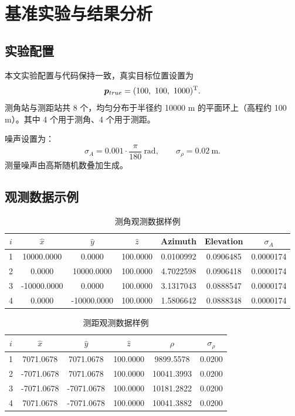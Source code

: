 \chapter{基准实验与结果分析}

\section{实验配置}
本文实验配置与代码保持一致，真实目标位置设置为
\[
\bm p_{true}=(100,\ 100,\ 1000)^{\mathrm{T}}.
\]
测角站与测距站共 8 个，均匀分布于半径约 10000 m 的平面环上（高程约 100 m）。其中 4 个用于测角、4 个用于测距。

噪声设置为：
\[
\sigma_A=0.001\cdot \frac{\pi}{180}\ \text{rad},\qquad
\sigma_\rho=0.02\ \text{m}.
\]
测量噪声由高斯随机数叠加生成。

\section{观测数据示例}
\begin{table}[H]
\centering
\caption{测角观测数据样例}
\begin{tabular}{ccccccc}
\toprule
$i$ & $\hat{x}$ & $\hat{y}$ & $\hat{z}$ & Azimuth & Elevation & $\sigma_A$ \\
\midrule
1 & 10000.0000 & 0.0000 & 100.0000 & 0.0100992 & 0.0906485 & 0.0000174 \\
2 & 0.0000 & 10000.0000 & 100.0000 & 4.7022598 & 0.0906418 & 0.0000174 \\
3 & -10000.0000 & 0.0000 & 100.0000 & 3.1317043 & 0.0888547 & 0.0000174 \\
4 & 0.0000 & -10000.0000 & 100.0000 & 1.5806642 & 0.0888348 & 0.0000174 \\
\bottomrule
\end{tabular}
\end{table}

\begin{table}[H]
\centering
\caption{测距观测数据样例}
\begin{tabular}{cccccc}
\toprule
$i$ & $\hat{x}$ & $\hat{y}$ & $\hat{z}$ & $\rho$ & $\sigma_\rho$ \\
\midrule
1 & 7071.0678 & 7071.0678 & 100.0000 & 9899.5578 & 0.0200 \\
2 & -7071.0678 & 7071.0678 & 100.0000 & 10041.3993 & 0.0200 \\
3 & -7071.0678 & -7071.0678 & 100.0000 & 10181.2822 & 0.0200 \\
4 & 7071.0678 & -7071.0678 & 100.0000 & 10041.3882 & 0.0200 \\
\bottomrule
\end{tabular}
\end{table}

